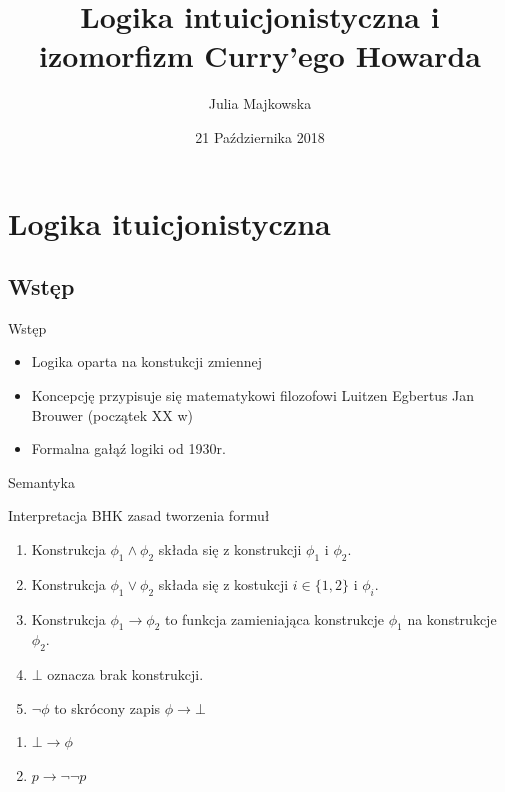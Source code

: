 \documentclass{beamer}
\title{Logika intuicjonistyczna i izomorfizm Curry'ego Howarda}
\author{Julia Majkowska}
\date{21 Października 2018}
\begin{document}
\begin{frame}
  \titlepage
\end{frame}

\begin{frame}{}
  \tableofcontents
\end{frame}

\section{Logika ituicjonistyczna}

\subsection{Wstęp}

\begin{frame}{Wstęp}
  \begin{itemize}
  \item {
   Logika oparta na konstukcji zmiennej
  }
  \item {
   Koncepcję przypisuje się matematykowi filozofowi Luitzen Egbertus Jan Brouwer (początek XX w)
  }
  \item {
   Formalna gałąź logiki od 1930r.
  }
  \end{itemize}
\end{frame}

\begin{frame}{Semantyka}
 \begin{block}{Interpretacja BHK zasad tworzenia formuł}
 \begin{enumerate}
  \item  Konstrukcja \(\phi_1 \wedge \phi_2  \) składa się z konstrukcji \(\phi_1\) i \(\phi_2\).
  \item  Konstrukcja \(\phi_1 \vee \phi_2  \) składa się z kostukcji \( i \in \{ 1, 2 \}\) i  \(\phi_i\).
  \item  Konstrukcja \(\phi_1 \rightarrow \phi_2  \) to funkcja zamieniająca konstrukcje \(\phi_1\) na konstrukcje \(\phi_2\).
  \item \( \bot\) oznacza brak konstrukcji.
  \item \( \neg \phi \) to skrócony zapis \( \phi \rightarrow \bot\)
 \end{enumerate}
   
\end{block}

\begin{example}
	\begin{enumerate}
	\item \(\bot \rightarrow \phi\)
	\item \( p \rightarrow \neg \neg p\)
	\end{enumerate}
\end{example}
\end{frame}
\end{document}
